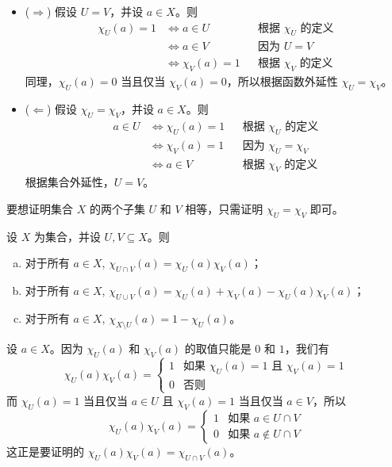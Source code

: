 \begin{cproof}
\fixlistskip
\begin{itemize}
\item ($\Rightarrow$)
假设 $U=V$，并设 $a \in X$。则
\begin{align*}
\chi_U(a) = 1 & \Leftrightarrow a \in U && \text{根据 $\chi_U$ 的定义} \\
&\Leftrightarrow a \in V && \text{因为 $U=V$} \\
&\Leftrightarrow \chi_V(a) = 1 && \text{根据 $\chi_V$ 的定义}
\end{align*}
同理，$\chi_U(a) = 0$ 当且仅当 $\chi_V(a) = 0$，所以根据函数外延性 $\chi_U = \chi_V$。

\item ($\Leftarrow$) 假设 $\chi_U = \chi_V$，并设 $a \in X$。则
\begin{align*}
a \in U & \Leftrightarrow \chi_U(a) = 1 && \text{根据 $\chi_U$ 的定义} \\
&\Leftrightarrow \chi_V(a) = 1 && \text{因为 $\chi_U = \chi_V$} \\
&\Leftrightarrow a \in V && \text{根据 $\chi_V$ 的定义}
\end{align*}
根据集合外延性，$U=V$。
\end{itemize}
\end{cproof}

\begin{strategy}[用特征函数证明集合恒等式]
\label{strSetIdentitiesFromCharacteristicFunctions}
要想证明集合 $X$ 的两个子集 $U$ 和 $V$ 相等，只需证明 $\chi_U = \chi_V$ 即可。
\end{strategy}

\begin{theorem}
\label{thmSetIdentitiesFromCharacteristicFunctions}
设 $X$ 为集合，并设 $U,V \subseteq X$。则
\begin{enumerate}[(a)]
\item 对于所有 $a \in X$, $\chi_{U \cap V}(a) = \chi_U(a) \chi_V(a)$；
\item 对于所有 $a \in X$, $\chi_{U \cup V}(a) = \chi_U(a) + \chi_V(a) - \chi_U(a)\chi_V(a)$；
\item 对于所有 $a \in X$, $\chi_{X \setminus U}(a) = 1 - \chi_U(a)$。
\end{enumerate}
\end{theorem}

\begin{cproof}[{(a)}]
设 $a \in X$。因为 $\chi_U(a)$ 和 $\chi_V(a)$ 的取值只能是 $0$ 和 $1$，我们有
\[ \chi_U(a) \chi_V(a) = \begin{cases} 1 & \text{如果 $\chi_U(a) = 1$ 且 $\chi_V(a) = 1$} \\ 0 & \text{否则} \end{cases} \]
而 $\chi_U(a) = 1$ 当且仅当 $a \in U$ 且 $\chi_V(a) = 1$ 当且仅当 $a \in V$，所以
\[ \chi_U(a) \chi_V(a) = \begin{cases} 1 & \text{如果 $a \in U \cap V$} \\ 0 & \text{如果 $a \not\in U \cap V$} \end{cases} \]
这正是要证明的 $\chi_U(a) \chi_V(a) = \chi_{U \cap V}(a)$。
\end{cproof}

